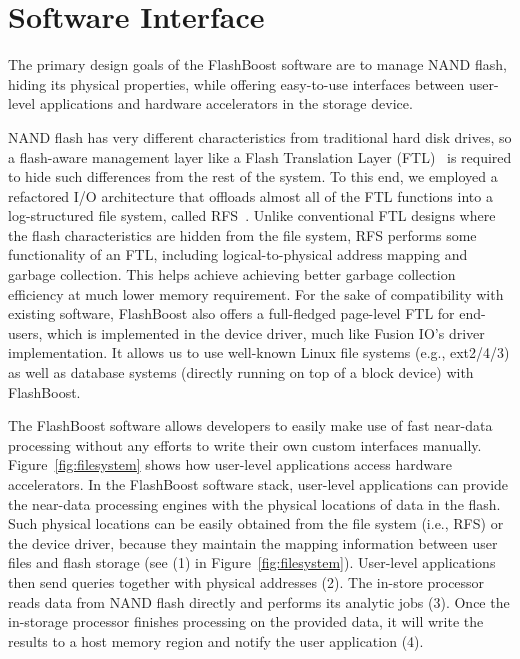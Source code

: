 \section{Software Interface}
\label{sec:software}

The primary design goals of the FlashBoost software are to manage NAND flash,
hiding its physical properties,
while offering easy-to-use interfaces 
between user-level applications and hardware accelerators in the storage device.

NAND flash has very different characteristics from traditional hard disk drives,
so a flash-aware management layer like a Flash Translation Layer (FTL)~\cite{}
is required to hide such differences from the rest of the system.
To this end, we employed a refactored I/O architecture
that offloads almost all of the FTL functions into a log-structured file system, called RFS~\cite{}.
Unlike conventional FTL designs where the flash characteristics are
hidden from the file system, RFS performs some functionality of an FTL,
including logical-to-physical address mapping and garbage collection.
This helps achieve achieving better garbage collection
efficiency at much lower memory requirement. For the sake of compatibility with
existing software, FlashBoost also offers a full-fledged page-level FTL for
end-users, which is implemented in the device driver, much like Fusion IO’s
driver implementation. It allows us to use well-known Linux file systems (e.g., ext2/4/3) 
as well as database systems (directly running on top of a block device) with FlashBoost.

The FlashBoost software allows developers to easily make use of fast near-data processing 
without any efforts to write their own custom interfaces manually. 
Figure~\ref{fig:filesystem} shows how user-level applications access hardware accelerators.
In the FlashBoost software stack, user-level
applications can provide the near-data processing engines with the physical
locations of data in the flash. 
Such physical locations can be easily obtained from the file
system (i.e., RFS) or the device driver, because they maintain the mapping
information between user files and flash storage (see (1) in Figure~\ref{fig:filesystem}). 
User-level applications then send queries together with physical addresses (2).
The in-store processor reads data from NAND flash directly and performs its analytic jobs (3).
Once the in-storage processor
finishes processing on the provided data, it will write the results to a host
memory region and notify the user application (4).

